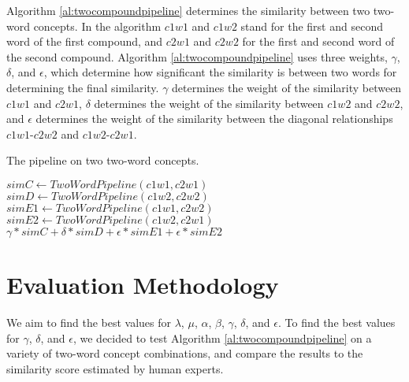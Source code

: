 \documentclass{article}
\begin{document}
Algorithm \ref{al:twocompoundpipeline} determines the similarity between two two-word concepts. In the algorithm $c1w1$ and $c1w2$ stand for the first and second word of the first compound, and $c2w1$ and $c2w2$ for the first and second word of the second compound. Algorithm \ref{al:twocompoundpipeline} uses three weights, $\gamma$, $\delta$, and $\epsilon$, which determine how significant the similarity is between two words for determining the final similarity. $\gamma$ determines the weight of the similarity between $c1w1$ and $c2w1$, $\delta$ determines the weight of the similarity between $c1w2$ and $c2w2$, and $\epsilon$ determines the weight of the similarity between the diagonal relationships $c1w1$-$c2w2$ and $c1w2$-$c2w1$.

\begin{algorithm}
\caption{The pipeline on two two-word concepts.}\label{al:twocompoundpipeline}
\begin{algorithmic}[1]
		\State $\textit{simC} \gets \textit{TwoWordPipeline}(c1w1, c2w1)$
		\State $\textit{simD} \gets \textit{TwoWordPipeline}(c1w2, c2w2)$
		\State $\textit{simE1} \gets \textit{TwoWordPipeline}(c1w1, c2w2)$
		\State $\textit{simE2} \gets \textit{TwoWordPipeline}(c1w2, c2w1)$
		\State \Return $\gamma * \textit{simC} + \delta * \textit{simD} + \epsilon * \textit{simE1} + \epsilon * \textit{simE2}$
	\EndProcedure
\end{algorithmic}
\end{algorithm}

\section{Evaluation Methodology} \label{sec:evalmeth}

We aim to find the best values for $\lambda$, $\mu$, $\alpha$, $\beta$, $\gamma$, $\delta$, and $\epsilon$. To find the best values for $\gamma$, $\delta$, and $\epsilon$, we decided to test Algorithm \ref{al:twocompoundpipeline} on a variety of two-word concept combinations, and compare the results to the similarity score estimated by human experts.
\end{document}
